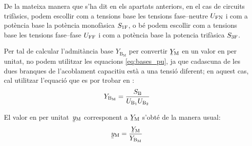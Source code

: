 De la mateixa manera que s'ha dit en els apartats anteriors, en el cas de circuits trif\`{a}sics, podem escollir com a tensions base les tensions fase--neutre $U_\mathrm{FN}$ i com a pot\`{e}ncia base la pot\`{e}ncia  monof\`{a}sica $S_\mathrm{1F}$, o b\'{e} podem escollir com a tensions base les tensions fase--fase $U_\mathrm{FF}$ i com a pot\`{e}ncia base la potencia trif\`{a}sica $S_\mathrm{3F}$.


Per tal de  calcular l'admit\`{a}ncia base $Y_{\text{B}_\text{M}}$ per convertir $\cmplx{Y}\ped{M}$ en un valor en per unitat, no podem utilitzar les equacions \eqref{eq:bases_pu}, ja que cadascuna de les dues branques de l'acoblament capacitiu est\`{a} a una tensi\'{o} diferent; en aquest cas, cal utilitzar l'equaci\'{o} que es por trobar en \cite{TLE}:
\begin{equation}
    Y_{\text{B}_\text{M}} = \frac{S_\mathrm{B}}{U_{\text{B}_1} U_{\text{B}_2}}
\end{equation}

El valor en per unitat\ $\cmplx{y}\ped{M}$ corresponent a $\cmplx{Y}\ped{M}$ s'obt\'{e} de la manera usual:
\begin{equation}
    \cmplx{y}\ped{M} = \frac{\cmplx{Y}\ped{M}}{Y_{\text{B}_\text{M}}}
\end{equation}
